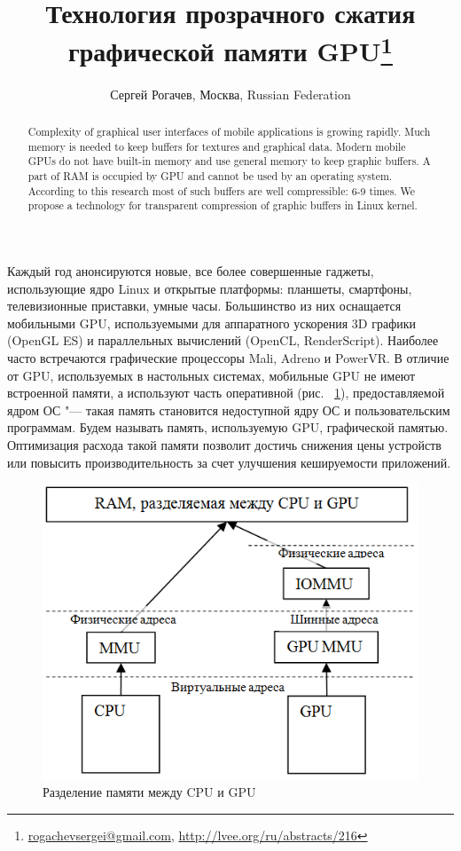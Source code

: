 \documentclass[10pt, a5paper]{article}
\begin{document}
\title{Технология прозрачного сжатия графической памяти GPU\footnote{\url{rogachevsergei@gmail.com}, \url{http://lvee.org/ru/abstracts/216}}}
\author{Сергей Рогачев, Москва, Russian Federation}
\maketitle
\begin{abstract}
Complexity of graphical user interfaces of mobile applications is growing rapidly. Much memory is needed to keep buffers for textures and graphical data. Modern mobile GPUs do not have built-in memory and use general memory to keep graphic buffers. A part of RAM is occupied by GPU and cannot be used by an operating system. According to this research most of such buffers are well compressible: 6-9 times. We propose a technology for transparent compression of graphic buffers in Linux kernel.
\end{abstract}
Каждый год анонсируются новые, все более совершенные гаджеты, использующие ядро Linux и открытые платформы: планшеты, смартфоны, телевизионные приставки, умные часы. Большинство из них оснащается мобильными GPU, используемыми для аппаратного ускорения 3D графики (OpenGL ES) и параллельных вычислений (OpenCL, RenderScript). Наиболее часто встречаются графические процессоры Mali, Adreno и PowerVR. В отличие от GPU, используемых в настольных системах, мобильные GPU не имеют встроенной памяти, а используют часть оперативной (рис. ~\ref{Rogachev1}), предоставляемой ядром ОС "--- такая память становится недоступной ядру ОС и пользовательским программам. Будем называть память, используемую GPU, графической памятью. Оптимизация расхода такой памяти позволит достичь снижения цены устройств или повысить производительность за счет улучшения кешируемости приложений.

\begin{figure}[h!]
  \centering
  \includegraphics[]{18_2016_Rogachev1.png}
  \caption{Разделение памяти между CPU и GPU}
  \label{Rogachev1}
\end{figure}
\end{document}
